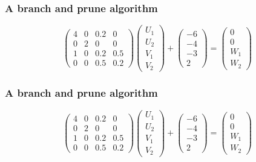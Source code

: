 \frame
{
\frametitle{A branch and prune algorithm}
\[\left(\begin{array}{cccc}
4&0&0.2&0\\
0&2&0&0\\
1&0&0.2&0.5\\
0&0&0.5&0.2
 \end{array}\right) \left(\begin{array}{c}
 U_1\\
 U_2\\
 V_1\\
 V_2
 \end{array}\right) + \left(\begin{array}{c}
 -6\\
 -4\\
 -3\\
 2
 \end{array}\right) =  \left(\begin{array}{c}
 0\\
 0\\
 W_1\\
 W_2
 \end{array}\right) 
 \]
\begin{figure}[h]
\centerline{
 \scalebox{0.5}{
    
 }
}
\end{figure}

}
\frame
{
\frametitle{A branch and prune algorithm}
\[\left(\begin{array}{cccc}
4&0&0.2&0\\
0&2&0&0\\
1&0&0.2&0.5\\
0&0&0.5&0.2
 \end{array}\right) \left(\begin{array}{c}
 U_1\\
 U_2\\
 V_1\\
 V_2
 \end{array}\right) + \left(\begin{array}{c}
 -6\\
 -4\\
 -3\\
 2
 \end{array}\right) =  \left(\begin{array}{c}
 0\\
 0\\
 W_1\\
 W_2
 \end{array}\right) 
 \]
\begin{figure}[h]
\centerline{
 \scalebox{0.5}{
    
 }
}
\end{figure}

}